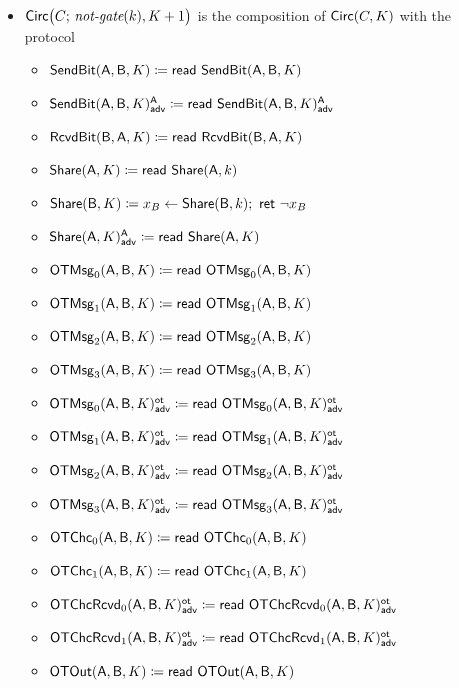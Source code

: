 \begin{itemize}
\item $\Circ\big(C; \, \notgate(k),K+1\big)$ is the composition of $\Circ(C,K)$ with the protocol
\begin{itemize}
\item $\SendBit(\A,\B,K) \coloneqq \read{\SendBit(\A,\B,K)}$
\item {\color{blue} $\LeakSendBit(\A,\B,K)^\A_\adv \coloneqq \read{\LeakSendBit(\A,\B,K)^\A_\adv}$}\smallskip
\item $\RcvdBit(\B,\A,K) \coloneqq \read{\RcvdBit(\B,\A,K)}$\smallskip
\item $\Share(\A,K) \coloneqq \read{\Share(\A,k)}$
\item $\Share(\B,K) \coloneqq x_B \leftarrow \Share(\B,k); \ \ret{\neg x_B}$
\item {\color{blue} $\LeakShare(\A,K)^\A_\adv \coloneqq \read{\Share(\A,K)}$}\smallskip
\item $\OTMsg_0(\A,\B,K) \coloneqq \read{\OTMsg_0(\A,\B,K)}$
\item $\OTMsg_1(\A,\B,K) \coloneqq \read{\OTMsg_1(\A,\B,K)}$
\item $\OTMsg_2(\A,\B,K) \coloneqq \read{\OTMsg_2(\A,\B,K)}$
\item $\OTMsg_3(\A,\B,K) \coloneqq \read{\OTMsg_3(\A,\B,K)}$\smallskip
\item {\color{blue} $\LeakOTMsg_0(\A,\B,K)^\ot_\adv \coloneqq \read{\LeakOTMsg_0(\A,\B,K)^\ot_\adv}$}
\item {\color{blue} $\LeakOTMsg_1(\A,\B,K)^\ot_\adv \coloneqq \read{\LeakOTMsg_1(\A,\B,K)^\ot_\adv}$}
\item {\color{blue} $\LeakOTMsg_2(\A,\B,K)^\ot_\adv \coloneqq \read{\LeakOTMsg_2(\A,\B,K)^\ot_\adv}$}
\item {\color{blue} $\LeakOTMsg_3(\A,\B,K)^\ot_\adv \coloneqq \read{\LeakOTMsg_3(\A,\B,K)^\ot_\adv}$}\smallskip
\item $\OTChc_0(\A,\B,K) \coloneqq \read{\OTChc_0(\A,\B,K)}$
\item $\OTChc_1(\A,\B,K) \coloneqq \read{\OTChc_1(\A,\B,K)}$\smallskip
\item {\color{blue} $\LeakOTChcRcvd_0(\A,\B,K)^\ot_\adv \coloneqq \read{\LeakOTChcRcvd_0(\A,\B,K)^\ot_\adv}$}
\item {\color{blue} $\LeakOTChcRcvd_1(\A,\B,K)^\ot_\adv \coloneqq \read{\LeakOTChcRcvd_1(\A,\B,K)^\ot_\adv}$}\smallskip
\item $\OTOut(\A,\B,K) \coloneqq \read{\OTOut(\A,\B,K)}$
\end{itemize}


\end{itemize}
